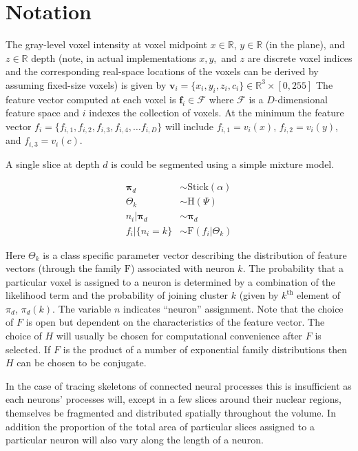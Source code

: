 \documentclass{article}
\begin{document}
\section{Notation}

The gray-level voxel intensity at voxel midpoint $x \in \mathbb{R}$, $y  \in \mathbb{R}$ (in the plane), and $z \in \mathbb{R}$ depth (note, in actual implementations $x,y,$ and $z$ are discrete voxel indices and the corresponding real-space locations of the voxels can be derived by assuming fixed-size voxels) is given by
$\mathbf v_i = \{x_i,y_i,z_i, c_i\} \in \mathbb{R}^3\times[0,255]$  The  feature vector computed at each voxel is $\mathbf f_i \in \mathcal{F}$ where $\mathcal{F}$ is a $D$-dimensional feature space and $i$ indexes the collection of voxels.  At the minimum the feature vector $f_i = \{ f_{i,1}, f_{i,2}, f_{i,3}, f_{i,4}, \ldots f_{i,D}\}$ will include $f_{i,1} = v_i(x)$, $f_{i,2} = v_i(y)$, and $f_{i,3} = v_i(c)$.

A single slice at depth $d$ is could be segmented using a simple mixture model.

\begin{align}
\boldsymbol\pi_d & \sim \text{Stick}(\alpha)\\
\Theta_{k} & \sim \text{H}(\Psi) \\
n_i | \boldsymbol\pi_d & \sim \boldsymbol\pi_d \\
f_{i} | \{ n_i = k \} & \sim \text{F}(f_{i} |\Theta_{k})
\end{align}

Here $\Theta_{k}$ is a class specific parameter vector describing the distribution of feature vectors (through the family $\text{F}$) associated with neuron $k$.  The probability that a particular voxel is assigned to a neuron is determined by a combination of the likelihood term and the probability of joining cluster $k$ (given by $k^{\text{th}}$ element of $\pi_{d}$,  $\pi_{d}(k).$  The variable  $n$ indicates ``neuron'' assignment.  Note that the choice of $F$ is open but dependent on the characteristics of the feature vector.  The choice of $H$ will usually be chosen for computational convenience after $F$ is selected.  If $F$ is the product of a number of exponential family distributions then $H$ can be chosen to be conjugate. 

In the case of tracing skeletons of connected neural processes this is insufficient as each neurons' processes will, except in a few slices around their nuclear regions, themselves be fragmented and distributed spatially throughout the volume.  In addition the proportion of the total area of particular slices assigned to a particular neuron will also vary along the length of a neuron.
\end{document}
